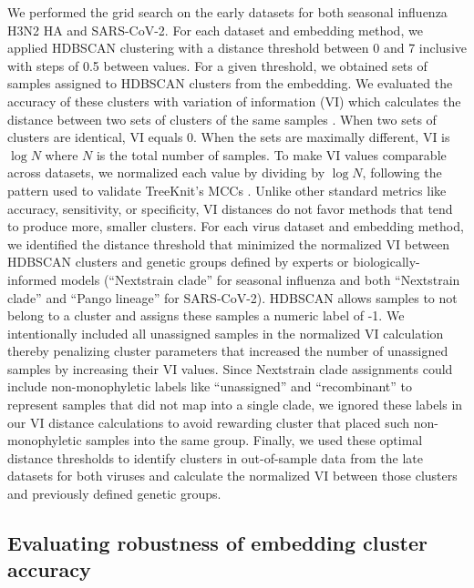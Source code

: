 \documentclass[10pt,letterpaper]{article}
\begin{document}
We performed the grid search on the early datasets for both seasonal influenza H3N2 HA and SARS-CoV-2.
For each dataset and embedding method, we applied HDBSCAN clustering with a distance threshold between 0 and 7 inclusive with steps of 0.5 between values.
For a given threshold, we obtained sets of samples assigned to HDBSCAN clusters from the embedding.
We evaluated the accuracy of these clusters with variation of information (VI) which calculates the distance between two sets of clusters of the same samples \cite{meilua2003comparing}.
When two sets of clusters are identical, VI equals 0.
When the sets are maximally different, VI is $\log{N}$ where $N$ is the total number of samples.
To make VI values comparable across datasets, we normalized each value by dividing by $\log{N}$, following the pattern used to validate TreeKnit's MCCs \cite{Barrat-Charlaix2022}.
Unlike other standard metrics like accuracy, sensitivity, or specificity, VI distances do not favor methods that tend to produce more, smaller clusters.
For each virus dataset and embedding method, we identified the distance threshold that minimized the normalized VI between HDBSCAN clusters and genetic groups defined by experts or biologically-informed models (``Nextstrain clade'' for seasonal influenza and both ``Nextstrain clade'' and ``Pango lineage'' for SARS-CoV-2).
HDBSCAN allows samples to not belong to a cluster and assigns these samples a numeric label of -1.
We intentionally included all unassigned samples in the normalized VI calculation thereby penalizing cluster parameters that increased the number of unassigned samples by increasing their VI values.
Since Nextstrain clade assignments could include non-monophyletic labels like ``unassigned'' and ``recombinant'' to represent samples that did not map into a single clade, we ignored these labels in our VI distance calculations to avoid rewarding cluster that placed such non-monophyletic samples into the same group.
Finally, we used these optimal distance thresholds to identify clusters in out-of-sample data from the late datasets for both viruses and calculate the normalized VI between those clusters and previously defined genetic groups.

\subsection*{Evaluating robustness of embedding cluster accuracy}
\end{document}
